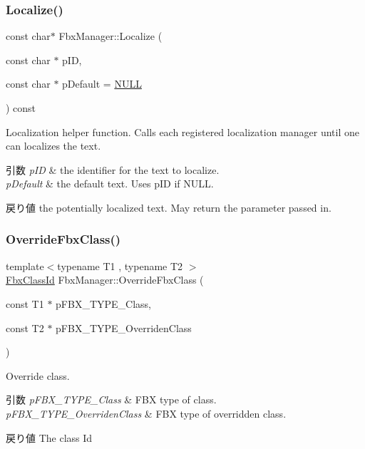 \subsubsection{\texorpdfstring{Localize()}{Localize()}}
{\footnotesize\ttfamily const char$\ast$ Fbx\+Manager\+::\+Localize (\begin{DoxyParamCaption}\item[{const char $\ast$}]{p\+ID,  }\item[{const char $\ast$}]{p\+Default = {\ttfamily \hyperlink{fbxarch_8h_a070d2ce7b6bb7e5c05602aa8c308d0c4}{N\+U\+LL}} }\end{DoxyParamCaption}) const}

Localization helper function. Calls each registered localization manager until one can localizes the text. 
\begin{DoxyParams}{引数}
{\em p\+ID} & the identifier for the text to localize. \\
\hline
{\em p\+Default} & the default text. Uses p\+ID if N\+U\+LL. \\
\hline
\end{DoxyParams}
\begin{DoxyReturn}{戻り値}
the potentially localized text. May return the parameter passed in. 
\end{DoxyReturn}
\mbox{\label{class_fbx_manager_ab97e0e9c93a1f545ed814ece12bcad59}} 
\subsubsection{\texorpdfstring{Override\+Fbx\+Class()}{OverrideFbxClass()}}
{\footnotesize\ttfamily template$<$typename T1 , typename T2 $>$ \\
\hyperlink{class_fbx_class_id}{Fbx\+Class\+Id} Fbx\+Manager\+::\+Override\+Fbx\+Class (\begin{DoxyParamCaption}\item[{const T1 $\ast$}]{p\+F\+B\+X\+\_\+\+T\+Y\+P\+E\+\_\+\+Class,  }\item[{const T2 $\ast$}]{p\+F\+B\+X\+\_\+\+T\+Y\+P\+E\+\_\+\+Overriden\+Class }\end{DoxyParamCaption})\hspace{0.3cm}{\ttfamily [inline]}}

Override class. 
\begin{DoxyParams}{引数}
{\em p\+F\+B\+X\+\_\+\+T\+Y\+P\+E\+\_\+\+Class} & F\+BX type of class. \\
\hline
{\em p\+F\+B\+X\+\_\+\+T\+Y\+P\+E\+\_\+\+Overriden\+Class} & F\+BX type of overridden class. \\
\hline
\end{DoxyParams}
\begin{DoxyReturn}{戻り値}
The class Id 
\end{DoxyReturn}



